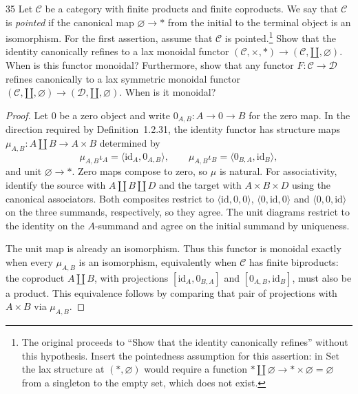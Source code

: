 \begin{exercise}{35}
Let $\mathcal C$ be a category with finite products and finite coproducts. We say that
$\mathcal C$ is \emph{pointed} if the canonical map $\varnothing\to\ast$ from the initial
to the terminal object is an isomorphism.
For the first assertion, assume that $\mathcal C$ is pointed.\footnote{The original
proceeds to ``Show that the identity canonically refines''
without this hypothesis. Insert the pointedness assumption for this assertion:
in $\mathrm{Set}$ the lax structure at $(\ast,\varnothing)$
would require a function
$\ast\amalg\varnothing\to\ast\times\varnothing=\varnothing$
from a singleton to the empty set, which does not exist.}
Show that the identity canonically refines to a lax monoidal functor
$(\mathcal C,\times,\ast)\to(\mathcal C,\amalg,\varnothing)$.
When is this functor monoidal? Furthermore, show that any functor
$F\colon\mathcal C\to\mathcal D$ refines canonically to a lax symmetric monoidal functor
$(\mathcal C,\amalg,\varnothing)\to(\mathcal D,\amalg,\varnothing)$.
When is it monoidal?

\begin{proof}
Let $0$ be a zero object and write $0_{A,B}\colon A\to0\to B$
for the zero map. In the direction required by
Definition~1.2.31, the identity functor has structure maps
$\mu_{A,B}\colon A\amalg B\to A\times B$ determined by
\[
 \mu_{A,B}\iota_A=\langle\mathrm{id}_A,0_{A,B}\rangle,
 \qquad
 \mu_{A,B}\iota_B=\langle0_{B,A},\mathrm{id}_B\rangle,
\]
and unit $\varnothing\to\ast$.
Zero maps compose to zero, so $\mu$ is natural.
For associativity, identify the source with $A\amalg B\amalg D$
and the target with $A\times B\times D$ using the canonical
associators. Both composites restrict to
$\langle\mathrm{id},0,0\rangle$,
$\langle0,\mathrm{id},0\rangle$ and
$\langle0,0,\mathrm{id}\rangle$ on the three summands,
respectively, so they agree. The unit diagrams restrict to
the identity on the $A$-summand and agree on the
initial summand by uniqueness.

The unit map is already an isomorphism. Thus this functor is
monoidal exactly when every $\mu_{A,B}$ is an isomorphism,
equivalently when $\mathcal C$ has finite biproducts: the
coproduct $A\amalg B$, with projections
$[\mathrm{id}_A,0_{B,A}]$ and $[0_{A,B},\mathrm{id}_B]$,
must also be a product. This equivalence follows by comparing
that pair of projections with $A\times B$ via $\mu_{A,B}$.


\end{proof}
\end{exercise}

